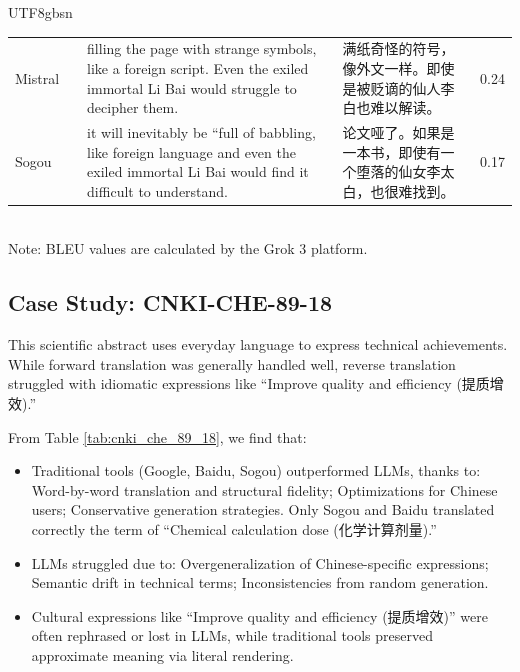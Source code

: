 \documentclass[conference]{IEEEtran}
\begin{document}
\begin{CJK}{UTF8}{gbsn}
\begin{table}[h]
\begin{tabular}{lp{4cm}p{4cm}p{4cm}l}
Mistral & & filling the page with strange symbols, like a foreign script. Even the exiled immortal Li Bai would struggle to decipher them. & 满纸奇怪的符号，像外文一样。即使是被贬谪的仙人李白也难以解读。 & 0.24 \\
Sogou & & it will inevitably be ``full of babbling, like foreign language and even the exiled immortal Li Bai would find it difficult to understand. & 论文哑了。如果是一本书，即使有一个堕落的仙女李太白，也很难找到。 & 0.17 \\
\bottomrule
\end{tabular}
\label{tab:xue_dejiong}
\\
\footnotesize{Note: BLEU values are calculated by the Grok 3 platform.}
\end{table}


\subsection{Case Study: CNKI-CHE-89-18}
This scientific abstract uses everyday language to express technical achievements. While forward translation was generally handled well, reverse translation struggled with idiomatic expressions like ``Improve quality and efficiency (提质增效).''

From Table \ref{tab:cnki_che_89_18}, we find that:
\begin{itemize}
 \item Traditional tools (Google, Baidu, Sogou) outperformed LLMs, thanks to: Word-by-word translation and structural fidelity; Optimizations for Chinese users; Conservative generation strategies. Only Sogou and Baidu translated correctly the term of ``Chemical calculation dose (化学计算剂量).''

 \item LLMs struggled due to: Overgeneralization of Chinese-specific expressions; Semantic drift in technical terms; Inconsistencies from random generation.

 \item Cultural expressions like ``Improve quality and efficiency (提质增效)'' were often rephrased or lost in LLMs, while traditional tools preserved approximate meaning via literal rendering.
\end{itemize}


\end{CJK}
\end{document}
